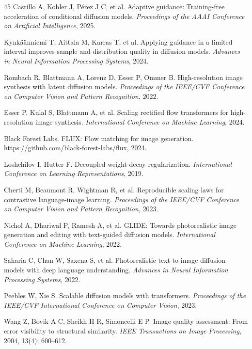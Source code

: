 \documentclass[times,twocolumn,final]{elsarticle}
\begin{document}
\begin{thebibliography}{45}
Castillo A, Kohler J, P\'erez J C, et al. Adaptive guidance: Training-free acceleration of conditional diffusion models. \textit{Proceedings of the AAAI Conference on Artificial Intelligence}, 2025.

Kynk\"a\"anniemi T, Aittala M, Karras T, et al. Applying guidance in a limited interval improves sample and distribution quality in diffusion models. \textit{Advances in Neural Information Processing Systems}, 2024.

Rombach R, Blattmann A, Lorenz D, Esser P, Ommer B. High-resolution image synthesis with latent diffusion models. \textit{Proceedings of the IEEE/CVF Conference on Computer Vision and Pattern Recognition}, 2022.

Esser P, Kulal S, Blattmann A, et al. Scaling rectified flow transformers for high-resolution image synthesis. \textit{International Conference on Machine Learning}, 2024.

Black Forest Labs. FLUX: Flow matching for image generation. https://github.com/black-forest-labs/flux, 2024.

Loshchilov I, Hutter F. Decoupled weight decay regularization. \textit{International Conference on Learning Representations}, 2019.

Cherti M, Beaumont R, Wightman R, et al. Reproducible scaling laws for contrastive language-image learning. \textit{Proceedings of the IEEE/CVF Conference on Computer Vision and Pattern Recognition}, 2023.

Nichol A, Dhariwal P, Ramesh A, et al. GLIDE: Towards photorealistic image generation and editing with text-guided diffusion models. \textit{International Conference on Machine Learning}, 2022.

Saharia C, Chan W, Saxena S, et al. Photorealistic text-to-image diffusion models with deep language understanding. \textit{Advances in Neural Information Processing Systems}, 2022.

Peebles W, Xie S. Scalable diffusion models with transformers. \textit{Proceedings of the IEEE/CVF International Conference on Computer Vision}, 2023.

Wang Z, Bovik A C, Sheikh H R, Simoncelli E P. Image quality assessment: From error visibility to structural similarity. \textit{IEEE Transactions on Image Processing}, 2004, 13(4): 600--612.


\end{thebibliography}
\end{document}
